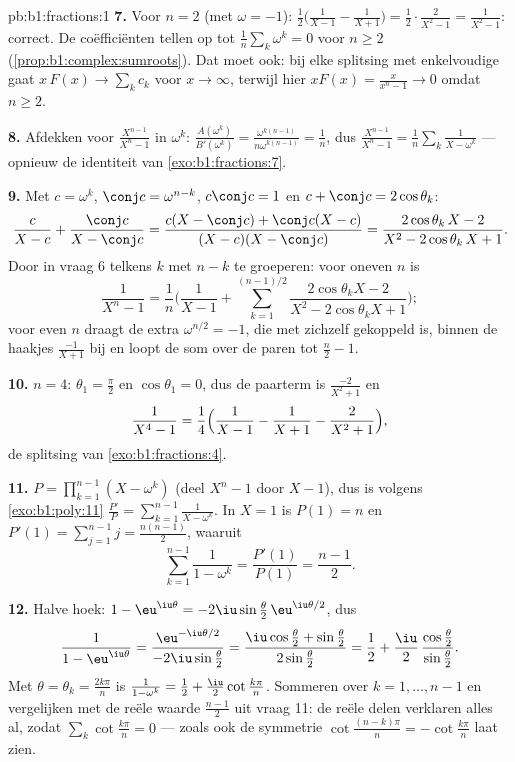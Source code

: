 \begin{solution}{pb:b1:fractions:1}
\textbf{7.} Voor $n = 2$ (met $\omega = -1$): $\frac12\bigl( \frac1{X-1}
- \frac1{X+1}\bigr) = \frac12\cdot\frac{2}{X^2-1} = \frac1{X^2-1}$:
correct. De coëfficiënten tellen op tot $\frac1n\sum_k\omega^k = 0$ voor
$n \geq 2$ (\cref{prop:b1:complex:sumroots}). Dat moet ook: bij elke
splitsing met enkelvoudige  gaat $x\,F(x) \to \sum_k c_k$ voor $x
\to \infty$, terwijl hier $xF(x) = \frac{x}{x^n-1} \to 0$ omdat $n \geq
2$.

\textbf{8.} Afdekken voor $\frac{X^{n-1}}{X^n - 1}$ in $\omega^k$:
$\frac{A(\omega^k)}{B'(\omega^k)} = \frac{\omega^{k(n-1)}}{n\omega^{k(n-1)}}
= \frac1n$, dus $\frac{X^{n-1}}{X^n-1} = \frac1n\sum_k\frac1{X -
\omega^k}$ --- opnieuw de identiteit van \cref{exo:b1:fractions:7}.

\textbf{9.} Met $c = \omega^k$, $\conj c = \omega^{n-k}$, $c\conj c = 1$
en $c + \conj c = 2\cos\theta_k$:
\[
\frac{c}{X - c} + \frac{\conj c}{X - \conj c}
= \frac{c(X - \conj c) + \conj c(X - c)}
{(X - c)(X - \conj c)}
= \frac{2\cos\theta_k\,X - 2}{X^2 - 2\cos\theta_k\,X + 1} .
\]
Door in vraag 6 telkens $k$ met $n - k$ te groeperen: voor oneven $n$ is
\[
\frac1{X^n - 1} = \frac1n\Biggl(\frac1{X-1} +
\sum_{k=1}^{(n-1)/2}
\frac{2\cos\theta_k X - 2}{X^2 - 2\cos\theta_k X + 1}\Biggr) ;
\]
voor even $n$ draagt de extra  $\omega^{n/2} = -1$, die met zichzelf
gekoppeld is, binnen de haakjes $\frac{-1}{X+1}$ bij en loopt de som over
de paren tot $\frac n2 - 1$.

\textbf{10.} $n = 4$: $\theta_1 = \frac\pi2$ en $\cos\theta_1 = 0$, dus
de paarterm is $\frac{-2}{X^2+1}$ en
\[
\frac1{X^4-1} = \frac14\Bigl(\frac1{X-1} - \frac1{X+1}
- \frac2{X^2+1}\Bigr) ,
\]
de splitsing van \cref{exo:b1:fractions:4}.

\textbf{11.} $P = \prod_{k=1}^{n-1}(X - \omega^k)$ (deel $X^n - 1$ door
$X - 1$), dus is volgens \cref{exo:b1:poly:11} $\frac{P'}P =
\sum_{k=1}^{n-1}\frac1{X-\omega^k}$. In $X = 1$ is $P(1) = n$ en $P'(1) =
\sum_{j=1}^{n-1}j = \frac{n(n-1)}2$, waaruit
\[
\sum_{k=1}^{n-1}\frac1{1 - \omega^k}
= \frac{P'(1)}{P(1)} = \frac{n-1}2 .
\]

\textbf{12.} Halve hoek: $1 - \eu^{\iu\theta} =
-2\iu\sin\frac\theta2\,\eu^{\iu\theta/2}$, dus
\[
\frac1{1 - \eu^{\iu\theta}}
= \frac{\eu^{-\iu\theta/2}}{-2\iu\sin\frac\theta2}
= \frac{\iu\cos\frac\theta2 + \sin\frac\theta2}
{2\sin\frac\theta2}
= \frac12 + \frac\iu2\,
\frac{\cos\frac\theta2}{\sin\frac\theta2} .
\]
Met $\theta = \theta_k = \frac{2k\pi}n$ is $\frac1{1-\omega^k} = \frac12
+ \frac\iu2\cot\frac{k\pi}n$. Sommeren over $k = 1, \dots, n-1$ en
vergelijken met de reële waarde $\frac{n-1}2$ uit vraag 11: de reële
delen verklaren alles al, zodat $\sum_k\cot\frac{k\pi}n = 0$ --- zoals
ook de symmetrie $\cot\frac{(n-k)\pi}n = -\cot\frac{k\pi}n$ laat zien.


\end{solution}
